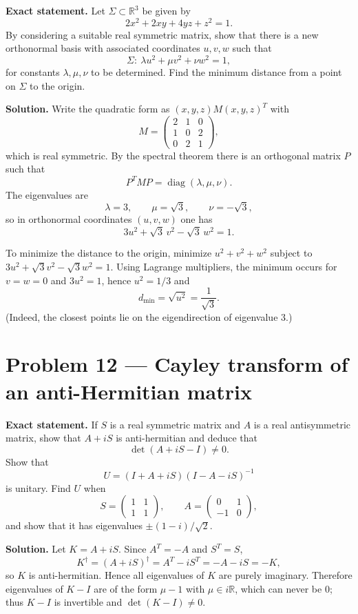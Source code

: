 \documentclass[12pt,a4paper]{article}
\theoremstyle{plain}
\theoremstyle{definition}      %
\begin{document}
\textbf{Exact statement.}
Let $\Sigma\subset\mathbb R^3$ be given by
\[
2x^2+2xy+4yz+z^2=1.
\]
By considering a suitable real symmetric matrix, show that there is a new orthonormal basis with associated coordinates $u,v,w$ such that
\[
\Sigma:\ \lambda u^2+\mu v^2+\nu w^2=1,
\]
for constants $\lambda,\mu,\nu$ to be determined. Find the minimum distance from a point on $\Sigma$ to the origin.

\textbf{Solution.}
Write the quadratic form as $(x,y,z)M(x,y,z)^T$ with
\[
M=\begin{pmatrix}
	2&1&0\\
	1&0&2\\
	0&2&1
\end{pmatrix},
\]
which is real symmetric. By the spectral theorem there is an orthogonal matrix $P$ such that
\[
P^T M P=\operatorname{diag}(\lambda,\mu,\nu).
\]
The eigenvalues are
\[
\lambda=3,\qquad \mu=\sqrt3,\qquad \nu=-\sqrt3,
\]
so in orthonormal coordinates $(u,v,w)$ one has
\[
3u^2+\sqrt3\,v^2-\sqrt3\,w^2=1.
\]

To minimize the distance to the origin, minimize $u^2+v^2+w^2$ subject to
$3u^2+\sqrt3 v^2-\sqrt3 w^2=1$. Using Lagrange multipliers,
the minimum occurs for $v=w=0$ and $3u^2=1$, hence $u^2=1/3$ and
\[
d_{\min}=\sqrt{u^2}=\frac1{\sqrt3}.
\]
(Indeed, the closest points lie on the eigendirection of eigenvalue $3$.)

\section*{Problem 12 — Cayley transform of an anti-Hermitian matrix}

\textbf{Exact statement.}
If $S$ is a real symmetric matrix and $A$ is a real antisymmetric matrix, show that $A+iS$ is anti-hermitian and deduce that
\[
\det(A+iS-I)\neq 0.
\]
Show that
\[
U=(I+A+iS)(I-A-iS)^{-1}
\]
is unitary. Find $U$ when
\[
S=\begin{pmatrix}1&1\\1&1\end{pmatrix},\qquad
A=\begin{pmatrix}0&1\\-1&0\end{pmatrix},
\]
and show that it has eigenvalues $\pm(1-i)/\sqrt2$.

\textbf{Solution.}
Let $K=A+iS$. Since $A^T=-A$ and $S^T=S$,
\[
K^\dagger=(A+iS)^\dagger=A^T-iS^T=-A-iS=-K,
\]
so $K$ is anti-hermitian. Hence all eigenvalues of $K$ are purely imaginary. Therefore eigenvalues of $K-I$ are of the form
$\mu-1$ with $\mu\in i\mathbb R$, which can never be $0$; thus $K-I$ is invertible and $\det(K-I)\neq 0$.
\end{document}

